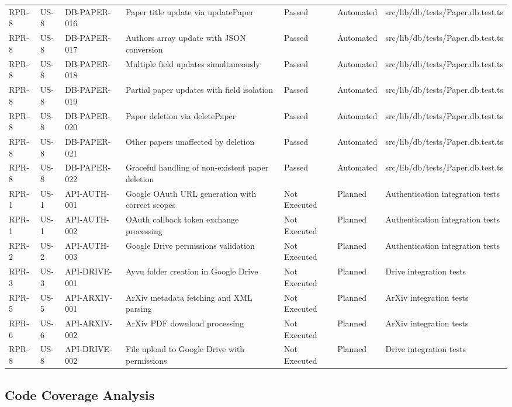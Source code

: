 \documentclass[12pt]{article}
\begin{document}
\begin{longtable}{|l|l|l|l|l|l|l|}
  RPR-8 & US-8 & DB-PAPER-016 & Paper title update via updatePaper & Passed & Automated & src/lib/db/tests/Paper.db.test.ts \\
  RPR-8 & US-8 & DB-PAPER-017 & Authors array update with JSON conversion & Passed & Automated & src/lib/db/tests/Paper.db.test.ts \\
  RPR-8 & US-8 & DB-PAPER-018 & Multiple field updates simultaneously & Passed & Automated & src/lib/db/tests/Paper.db.test.ts \\
  RPR-8 & US-8 & DB-PAPER-019 & Partial paper updates with field isolation & Passed & Automated & src/lib/db/tests/Paper.db.test.ts \\
  RPR-8 & US-8 & DB-PAPER-020 & Paper deletion via deletePaper & Passed & Automated & src/lib/db/tests/Paper.db.test.ts \\
  RPR-8 & US-8 & DB-PAPER-021 & Other papers unaffected by deletion & Passed & Automated & src/lib/db/tests/Paper.db.test.ts \\
  RPR-8 & US-8 & DB-PAPER-022 & Graceful handling of non-existent paper deletion & Passed & Automated & src/lib/db/tests/Paper.db.test.ts \\
  \hline
  RPR-1 & US-1 & API-AUTH-001 & Google OAuth URL generation with correct scopes & Not Executed & Planned & Authentication integration tests \\
  RPR-1 & US-1 & API-AUTH-002 & OAuth callback token exchange processing & Not Executed & Planned & Authentication integration tests \\
  RPR-2 & US-2 & API-AUTH-003 & Google Drive permissions validation & Not Executed & Planned & Authentication integration tests \\
  RPR-3 & US-3 & API-DRIVE-001 & Ayvu folder creation in Google Drive & Not Executed & Planned & Drive integration tests \\
  RPR-5 & US-5 & API-ARXIV-001 & ArXiv metadata fetching and XML parsing & Not Executed & Planned & ArXiv integration tests \\
  RPR-6 & US-6 & API-ARXIV-002 & ArXiv PDF download processing & Not Executed & Planned & ArXiv integration tests \\
  RPR-8 & US-8 & API-DRIVE-002 & File upload to Google Drive with permissions & Not Executed & Planned & Drive integration tests \\
\end{longtable}

\subsection{Code Coverage Analysis}
\end{document}
